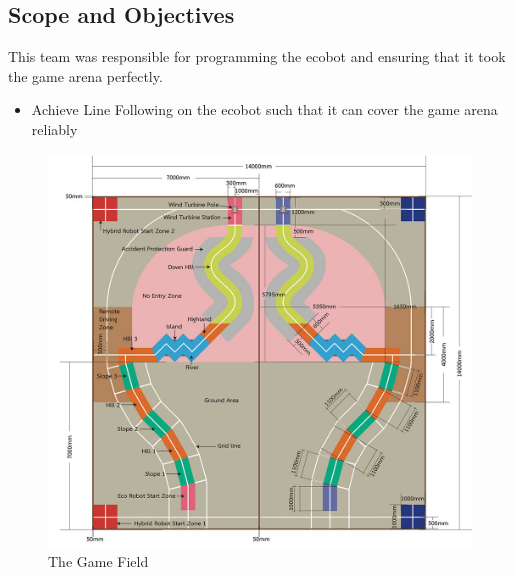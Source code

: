 \documentclass[12pt,a4paper]{article}
\begin{document}
    \subsection{Scope and Objectives}
      This team was responsible for programming the ecobot and ensuring that 
      it took the game arena perfectly.\\
      \begin{itemize}
        \item Achieve Line Following on the ecobot such that it can cover the game arena reliably
      \end{itemize}
      \begin{figure}[h]
        \centering
        \includegraphics[width=\textwidth]{gamefield}
        \caption{The Game Field}
      \end{figure}
    \clearpage
\end{document}
